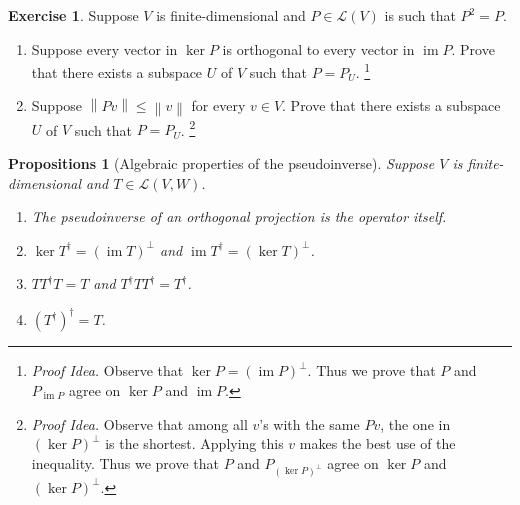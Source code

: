 \documentclass[nofonts,colorlinks]{tufte-handout}
\theoremstyle{plain} %
\newtheorem{props}[thm]{Propositions}
\theoremstyle{definition}
\newtheorem{exer}[thm]{Exercise}
\theoremstyle{remark}
\def\idea{\textit{\color[rgb]{0,0,.55}Proof Idea. }}
\newcommand{\bra}[1]{\mathopen{}\left(#1\right)}
\newcommand{\norm}[1]{\mathopen{}\left\lVert#1\right\rVert}
\renewcommand{\L}{\mathcal{L}}
\DeclareMathOperator{\im}{im}
\begin{document}
\begin{exer}
	Suppose $V$ is finite-dimensional and  $P\in\L(V)$ is such that $P^2=P$.
	\begin{enumerate}
		\item Suppose every vector in $\ker P$ is orthogonal to every vector in $\im P$. Prove that there exists a subspace $U$ of $V$ such that $P=P_U$.%
		\footnote{\idea Observe that $\ker P=(\im P)^\perp$. Thus we prove that $P$ and $P_{\im P}$ agree on $\ker P$ and $\im P$.}
		\item Suppose $\norm{Pv}\leq\norm{v}$ for every $v\in V$. Prove that there exists a subspace $U$ of $V$ such that $P=P_U$.%
		\footnote{\idea Observe that among all $v$'s with the same $Pv$, the one in $(\ker P)^\perp$ is the shortest. Applying this $v$ makes the best use of the inequality. Thus we prove that $P$ and $P_{(\ker P)^\perp}$ agree on $\ker P$ and $(\ker P)^\perp$.}
	\end{enumerate}
\end{exer}

\begin{props}[Algebraic properties of the pseudoinverse]
	Suppose $V$ is finite-dimensional and $T\in\L(V,W)$.
	\begin{enumerate}
		\item The pseudoinverse of an orthogonal projection is the operator itself.
		\item $\ker T^\dagger=(\im T)^\perp$ and $\im T^\dagger=(\ker T)^\perp$.
		\item $TT^\dagger T=T$ and $T^\dagger TT^\dagger=T^\dagger$.
		\item $\bra{T^\dagger}^\dagger=T$.
	\end{enumerate}
\end{props}
\end{document}
